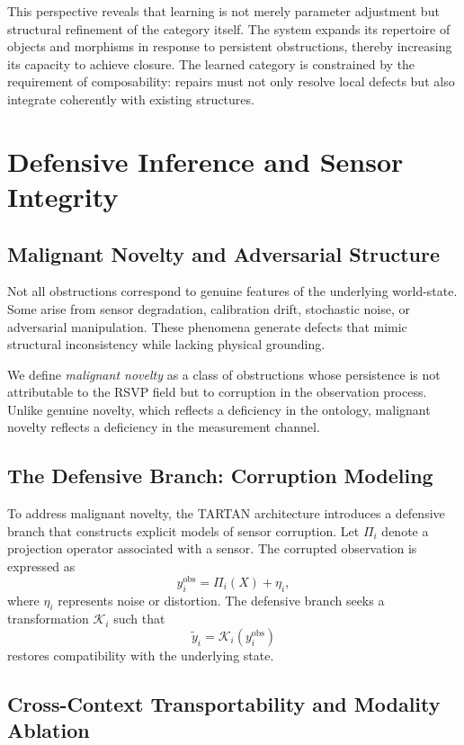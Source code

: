 \documentclass[12pt, oneside]{article}
\begin{document}
This perspective reveals that learning is not merely parameter adjustment but structural refinement of the category itself. The system expands its repertoire of objects and morphisms in response to persistent obstructions, thereby increasing its capacity to achieve closure. The learned category is constrained by the requirement of composability: repairs must not only resolve local defects but also integrate coherently with existing structures.

\section{Defensive Inference and Sensor Integrity}

\subsection{Malignant Novelty and Adversarial Structure}

Not all obstructions correspond to genuine features of the underlying world-state. Some arise from sensor degradation, calibration drift, stochastic noise, or adversarial manipulation. These phenomena generate defects that mimic structural inconsistency while lacking physical grounding.

We define \emph{malignant novelty} as a class of obstructions whose persistence is not attributable to the RSVP field but to corruption in the observation process. Unlike genuine novelty, which reflects a deficiency in the ontology, malignant novelty reflects a deficiency in the measurement channel.

\subsection{The Defensive Branch: Corruption Modeling}

To address malignant novelty, the TARTAN architecture introduces a defensive branch that constructs explicit models of sensor corruption. Let $\Pi_i$ denote a projection operator associated with a sensor. The corrupted observation is expressed as
\[
y_i^{\text{obs}} = \Pi_i(X) + \eta_i,
\]
where $\eta_i$ represents noise or distortion. The defensive branch seeks a transformation $\mathcal{K}_i$ such that
\[
\tilde{y}_i = \mathcal{K}_i(y_i^{\text{obs}})
\]
restores compatibility with the underlying state.

\subsection{Cross-Context Transportability and Modality Ablation}
\end{document}
